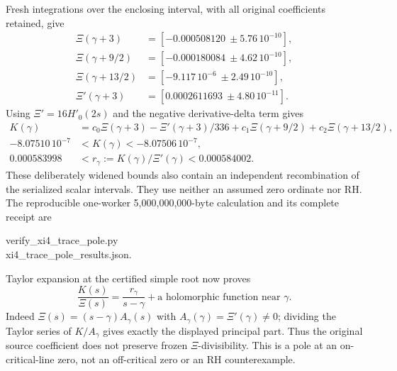 Fresh integrations over the enclosing interval, with all original
coefficients retained, give
\[
\begin{aligned}
 \Xi(\gamma+3)&=[-0.000508120\ \pm5.76\,10^{-10}],\\
 \Xi(\gamma+9/2)&=[-0.000180084\ \pm4.62\,10^{-10}],\\
 \Xi(\gamma+13/2)&=[-9.117\,10^{-6}\ \pm2.49\,10^{-10}],\\
 \Xi'(\gamma+3)&=[0.0002611693\ \pm4.80\,10^{-11}].
\end{aligned}
\]
Using $\Xi'=16H'_0(2s)$ and the negative derivative-delta term gives
\begin{equation}\label{eq:xp-nonzero}
\begin{split}
 K(\gamma)&=c_0\Xi(\gamma+3)-\Xi'(\gamma+3)/336
          +c_1\Xi(\gamma+9/2)+c_2\Xi(\gamma+13/2),\\
 -8.07510\,10^{-7}&<K(\gamma)<-8.07506\,10^{-7},\\
 0.000583998&<r_\gamma:=K(\gamma)/\Xi'(\gamma)<0.000584002.
\end{split}
\end{equation}
These deliberately widened bounds also contain an independent
recombination of the serialized scalar intervals. They use neither
an assumed zero ordinate nor RH. The reproducible one-worker
5,000,000,000-byte calculation and its complete receipt are
\begin{center}\ttfamily
verify\_xi4\_trace\_pole.py\\
xi4\_trace\_pole\_results.json.
\end{center}

Taylor expansion at the certified simple root now proves
\begin{equation}\label{eq:xp-ratio-pole}
 \frac{K(s)}{\Xi(s)}=\frac{r_\gamma}{s-\gamma}
                  +\text{a holomorphic function near }\gamma.
\end{equation}
Indeed $\Xi(s)=(s-\gamma)A_\gamma(s)$ with
$A_\gamma(\gamma)=\Xi'(\gamma)\ne0$; dividing the Taylor series
of $K/A_\gamma$ gives exactly the displayed principal part.
Thus the original source coefficient does not preserve frozen
$\Xi$-divisibility. This is a pole at an on-critical-line zero,
not an off-critical zero or an RH counterexample.

